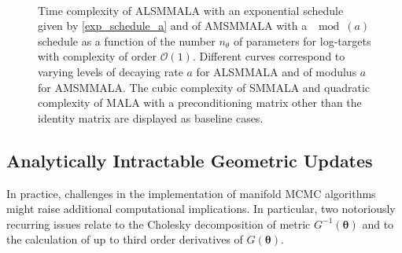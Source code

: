 \documentclass[twoside,11pt]{article}
\begin{document}
\begin{figure}[t]
	\centering
	 \\
	\caption{
		Time complexity of ALSMMALA with an exponential schedule given by \eqref{exp_schedule_a} and of AMSMMALA with a 
		$\mod{(a)}$ schedule as a function of the number $n_{\theta}$ of parameters for log-targets with complexity of order
		$\mathcal{O}(1)$. Different curves correspond to varying levels of decaying rate $a$ for ALSMMALA and of modulus $a$ for 
		AMSMMALA. The cubic complexity of SMMALA and quadratic complexity of MALA with a preconditioning matrix other than the 
		identity matrix are displayed as baseline cases.
	}
	\label{fig:alsmmala_amsmmala_schedule}
\end{figure}

\subsection{Analytically Intractable Geometric Updates}

In practice, challenges in the implementation of manifold MCMC algorithms might raise additional computational implications.
In particular, two notoriously recurring issues relate to the Cholesky decomposition of metric $G^{-1}(\boldsymbol{\theta})$ 
and to the calculation of up to third order derivatives of $G(\boldsymbol{\theta})$.
\end{document}
